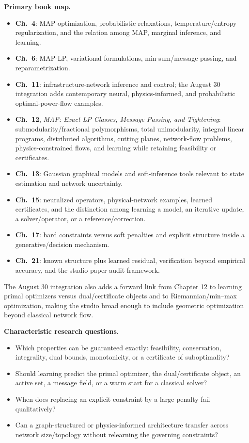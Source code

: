 \documentclass[11pt]{article}
\newcommand{\bookch}[1]{\textbf{Ch.~#1}}
\begin{document}
\textbf{Primary book map.}
\begin{itemize}
    \item \bookch{4}: MAP optimization, probabilistic relaxations, temperature/entropy regularization, and the relation among MAP, marginal inference, and learning.
    \item \bookch{6}: MAP-LP, variational formulations, min-sum/message passing, and reparametrization.
    \item \bookch{11}: infrastructure-network inference and control; the August 30 integration adds contemporary neural, physics-informed, and probabilistic optimal-power-flow examples.
    \item \bookch{12}, \emph{MAP: Exact LP Classes, Message Passing, and Tightening}: submodularity/fractional polymorphisms, total unimodularity, integral linear programs, distributed algorithms, cutting planes, network-flow problems, physics-constrained flows, and learning while retaining feasibility or certificates.
    \item \bookch{13}: Gaussian graphical models and soft-inference tools relevant to state estimation and network uncertainty.
    \item \bookch{15}: neuralized operators, physical-network examples, learned certificates, and the distinction among learning a model, an iterative update, a solver/operator, or a reference/correction.
    \item \bookch{17}: hard constraints versus soft penalties and explicit structure inside a generative/decision mechanism.
    \item \bookch{21}: known structure plus learned residual, verification beyond empirical accuracy, and the studio-paper audit framework.
\end{itemize}

The August 30 integration also adds a forward link from Chapter 12 to learning primal optimizers versus dual/certificate objects and to Riemannian/min--max optimization, making the studio broad enough to include geometric optimization beyond classical network flow.

\textbf{Characteristic research questions.}
\begin{itemize}
    \item Which properties can be guaranteed exactly: feasibility, conservation, integrality, dual bounds, monotonicity, or a certificate of suboptimality?
    \item Should learning predict the primal optimizer, the dual/certificate object, an active set, a message field, or a warm start for a classical solver?
    \item When does replacing an explicit constraint by a large penalty fail qualitatively?
    \item Can a graph-structured or physics-informed architecture transfer across network size/topology without relearning the governing constraints?
\end{itemize}
\end{document}
